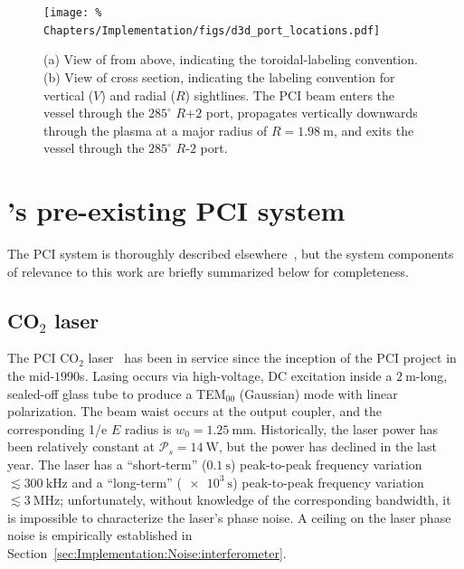 \begin{figure}
  \centering
  \texttt{[image: \%
    Chapters/Implementation/figs/d3d\_port\_locations.pdf]}
  \caption[\diiid \space port-labeling conventions and location of PCI]{%
    (a) View of \diiid \space from above,
    indicating the toroidal-labeling convention.
    (b) View of \diiid \space cross section,
    indicating the labeling convention
    for vertical ($V$) and radial ($R$) sightlines.
    The PCI beam enters the vessel through the $285^{\circ}$ {$R$+$2$} port,
    propagates vertically downwards through the plasma
    at a major radius of $R = \SI{1.98}{\meter}$, and
    exits the vessel through the $285^{\circ}$ {$R$-$2$} port.}
\label{fig:Implementation:d3d_port_locations}
\end{figure}


\section{\diiid's pre-existing PCI system}
\label{sec:Implementation:PCI}
The \diiid \space PCI system is
thoroughly described elsewhere~\cite{dorris_rsi09, dorris_phd}, but
the system components of relevance to this work
are briefly summarized below for completeness.


\subsection{CO$_2$ laser}
\label{sec:Implementation:PCI:laser}
The PCI CO$_2$ laser~\cite[Sec.~3.3]{coda_phd}
has been in service since
the inception of the \diiid\space PCI project in the mid-$1990$s.
Lasing occurs via high-voltage, DC excitation
inside a $\SI{2}{\meter}$-long, sealed-off glass tube
to produce a TEM$_{00}$ (Gaussian) mode with linear polarization.
The beam waist occurs at the output coupler, and
the corresponding 1/e $E$ radius is $w_0 = \SI{1.25}{\milli\meter}$.
Historically, the laser power has been relatively constant
at $\mathcal{P}_s = \SI{14}{\watt}$, but
the power has declined in the last year.
The laser has
a ``short-term'' ($\SI{0.1}{\second}$) peak-to-peak frequency variation
$\lesssim \SI{300}{\kilo\hertz}$ and
a ``long-term'' ($\SI{e3}{\second}$) peak-to-peak frequency variation
$\lesssim \SI{3}{\mega\hertz}$;
unfortunately, without knowledge of the corresponding bandwidth,
it is impossible to characterize the laser's phase noise.
A ceiling on the laser phase noise is empirically established in
Section~\ref{sec:Implementation:Noise:interferometer}.


